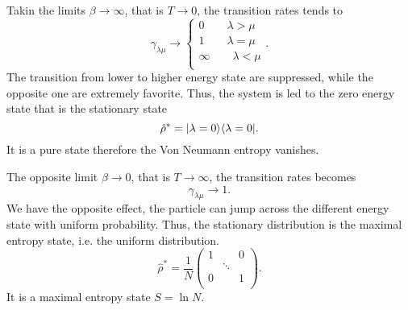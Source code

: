 Takin the limits $\beta \rightarrow \infty$, that is $T  \rightarrow 0$, the transition rates tends to
\begin{equation}
    \gamma_{\lambda\mu} \rightarrow \left\{\begin{aligned}
        0 \qquad \lambda > \mu\\
        1 \qquad \lambda = \mu\\
        \infty \qquad  \lambda < \mu \\
    \end{aligned}\right. . 
\end{equation}
The transition from lower to higher energy state are suppressed, while the opposite one are extremely favorite. Thus, the system is led to the zero energy state that is the stationary state
\begin{equation}\label{beta_inf_stationary_distribution}
    \hat\rho^* = \lvert\lambda = 0\rangle\langle\lambda = 0\rvert.
\end{equation} 
It is a pure state therefore the Von Neumann entropy vanishes.

The opposite limit $\beta \rightarrow 0$, that is $T \rightarrow \infty$, the transition rates becomes
\begin{equation}
    \gamma_{\lambda\mu} \rightarrow 1.
\end{equation}
We have the opposite effect, the particle can jump across the different energy state with uniform probability. Thus, the stationary distribution is the maximal entropy state, i.e. the uniform distribution.
\begin{equation}
    \hat\rho^* = \frac{1}{N}\begin{pmatrix}
        1&&0\\
        &\ddots&\\
        0&&1\\
    \end{pmatrix}.
\end{equation}
It is a maximal entropy state $S = \ln N$.

